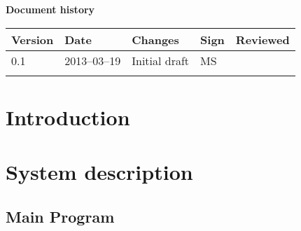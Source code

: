\documentclass[10pt, a4paper, twoside]{article}
\numberwithin{equation}{subsection}
\numberwithin{figure}{section}
\numberwithin{table}{section}
\begin{document}



\newpage
\pagestyle{fancy}
\setcounter{page}{2} %




\newpage
\tableofcontents
\listoffigures



\newpage
\vspace*{5\baselineskip}

\begin{center}
\textbf{\LARGE Document history}

{ \footnotesize 
\begin{tabular}{|p{1cm}|p{2.0cm}|p{5cm}|p{1.5cm}|p{2cm}|}
	\hline
	\textbf{Version} & \textbf{Date} & \textbf{Changes} & \textbf{Sign} & \textbf{Reviewed} \\
	
	\hline
	0.1 & 2013--03--19 & Initial draft & MS & \\
	
	\hline
	 &  &  &  &  \\
	
	\hline
\end{tabular}
}
\end{center}





%
%
\newpage
{}

\newpage
\section{Introduction}


\section{System description}
\label{sec:system_description}


\newpage
\subsection{Main Program}
\label{sec:main_program}

\end{document}
